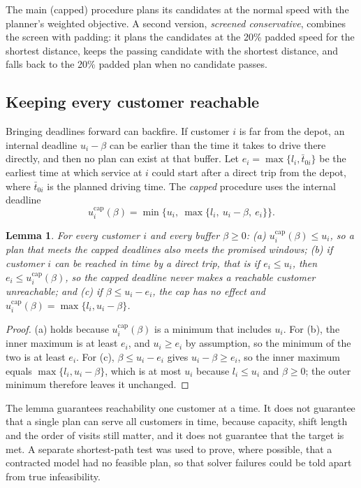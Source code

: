 \documentclass[12pt,letterpaper]{article}
\newtheorem{lemma}{Lemma}
\begin{document}
The main (capped) procedure plans its candidates at the normal speed with the
planner's weighted objective. A second version, \emph{screened conservative},
combines the screen with padding: it plans the candidates at the 20\% padded speed
for the shortest distance, keeps the passing candidate with the shortest distance,
and falls back to the 20\% padded plan when no candidate passes.

\subsection{Keeping every customer reachable}

Bringing deadlines forward can backfire. If customer $i$ is far from the depot, an
internal deadline $u_i-\beta$ can be earlier than the time it takes to drive there
directly, and then no plan can exist at that buffer. Let
$e_i=\max\{l_i,\bar t_{0i}\}$ be the earliest time at which service at $i$ could
start after a direct trip from the depot, where $\bar t_{0i}$ is the planned
driving time. The \emph{capped} procedure uses the internal deadline
\begin{equation}
 u_i^{\mathrm{cap}}(\beta)=\min\bigl\{u_i,\ \max\{l_i,\ u_i-\beta,\ e_i\}\bigr\}.
 \label{eq:cap}
\end{equation}

\begin{lemma}\label{lem:cap}
For every customer $i$ and every buffer $\beta\ge0$:
(a) $u_i^{\mathrm{cap}}(\beta)\le u_i$, so a plan that meets the capped deadlines
also meets the promised windows;
(b) if customer $i$ can be reached in time by a direct trip, that is if
$e_i\le u_i$, then $e_i\le u_i^{\mathrm{cap}}(\beta)$, so the capped deadline never
makes a reachable customer unreachable; and
(c) if $\beta\le u_i-e_i$, the cap has no effect and
$u_i^{\mathrm{cap}}(\beta)=\max\{l_i,u_i-\beta\}$.
\end{lemma}

\begin{proof}
(a) holds because $u_i^{\mathrm{cap}}(\beta)$ is a minimum that includes $u_i$.
For (b), the inner maximum is at least $e_i$, and $u_i\ge e_i$ by assumption, so the
minimum of the two is at least $e_i$. For (c), $\beta\le u_i-e_i$ gives
$u_i-\beta\ge e_i$, so the inner maximum equals $\max\{l_i,u_i-\beta\}$, which is
at most $u_i$ because $l_i\le u_i$ and $\beta\ge0$; the outer minimum therefore
leaves it unchanged.
\end{proof}

The lemma guarantees reachability one customer at a time. It does not guarantee
that a single plan can serve all customers in time, because capacity, shift length
and the order of visits still matter, and it does not guarantee that the target is
met. A separate shortest-path test was used to prove, where possible, that a
contracted model had no feasible plan, so that solver failures could be told apart
from true infeasibility.
\end{document}
